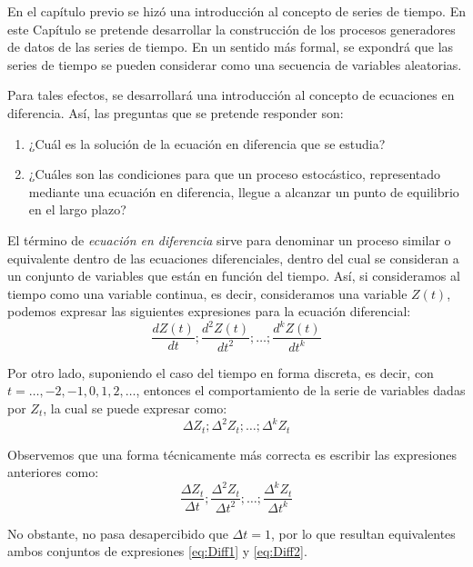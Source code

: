 \documentclass[
]{book}
\begin{document}
En el capítulo previo se hizó una introducción al concepto de series de tiempo. En este Capítulo se pretende desarrollar la construcción de los procesos generadores de datos de las series de tiempo. En un sentido más formal, se expondrá que las series de tiempo se pueden considerar como una secuencia de variables aleatorias.

Para tales efectos, se desarrollará una introducción al concepto de ecuaciones en diferencia. Así, las preguntas que se pretende responder son:

\begin{enumerate}
\def\labelenumi{\arabic{enumi}.}
\item
  ¿Cuál es la solución de la ecuación en diferencia que se estudia?
\item
  ¿Cuáles son las condiciones para que un proceso estocástico, representado mediante una ecuación en diferencia, llegue a alcanzar un punto de equilibrio en el largo plazo?
\end{enumerate}

El término de \emph{ecuación en diferencia} sirve para denominar un proceso similar o equivalente dentro de las ecuaciones diferenciales, dentro del cual se consideran a un conjunto de variables que están en función del tiempo. Así, si consideramos al tiempo como una variable continua, es decir, consideramos una variable \(Z(t)\), podemos expresar las siguientes expresiones para la ecuación diferencial:
\begin{equation}
    \frac{dZ(t)}{dt}; \frac{d^2Z(t)}{dt^2}; \ldots; \frac{d^kZ(t)}{dt^k}
        \label{eq:eqDiff}
\end{equation}

Por otro lado, suponiendo el caso del tiempo en forma discreta, es decir, con \(t = \ldots, -2, -1, 0, 1, 2, \ldots\), entonces el comportamiento de la serie de variables dadas por \(Z_t\), la cual se puede expresar como:
\begin{equation}
    \Delta Z_t; \Delta^2 Z_t; \ldots; \Delta^k Z_t
    \label{eq:Diff1}
\end{equation}

Observemos que una forma técnicamente más correcta es escribir las expresiones anteriores como:
\begin{equation}
    \frac{\Delta Z_t}{\Delta t}; \frac{\Delta^2 Z_t}{\Delta t^2}; \ldots; \frac{\Delta^k Z_t}{\Delta t^k}
    \label{eq:Diff2}
\end{equation}

No obstante, no pasa desapercibido que \(\Delta t = 1\), por lo que resultan equivalentes ambos conjuntos de expresiones \eqref{eq:Diff1} y \eqref{eq:Diff2}.
\end{document}
